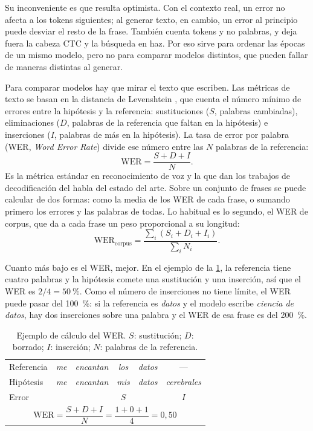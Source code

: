 Su inconveniente es que resulta optimista. Con el contexto real, un error no afecta a los tokens siguientes; al generar texto, en cambio, un error al principio puede desviar el resto de la frase. También cuenta tokens y no palabras, y deja fuera la cabeza CTC y la búsqueda en haz. Por eso sirve para ordenar las épocas de un mismo modelo, pero no para comparar modelos distintos, que pueden fallar de maneras distintas al generar.

Para comparar modelos hay que mirar el texto que escriben. Las métricas de texto se basan en la distancia de Levenshtein \cite{levenshtein1966}, que cuenta el número mínimo de errores entre la hipótesis y la referencia: sustituciones ($S$, palabras cambiadas), eliminaciones ($D$, palabras de la referencia que faltan en la hipótesis) e inserciones ($I$, palabras de más en la hipótesis). La tasa de error por palabra (WER, \textit{Word Error Rate}) divide ese número entre las $N$ palabras de la referencia:
\begin{equation}
  \mathrm{WER} = \frac{S + D + I}{N}.
  \label{eq:wer}
\end{equation}
Es la métrica estándar en reconocimiento de voz y la que dan los trabajos de decodificación del habla del estado del arte. Sobre un conjunto de frases se puede calcular de dos formas: como la media de los WER de cada frase, o sumando primero los errores y las palabras de todas. Lo habitual es lo segundo, el WER de corpus, que da a cada frase un peso proporcional a su longitud:
\begin{equation}
  \mathrm{WER}_{\mathrm{corpus}} = \frac{\sum_{i} (S_i + D_i + I_i)}{\sum_{i} N_i}.
  \label{eq:wer-corpus}
\end{equation}

Cuanto más bajo es el WER, mejor. En el ejemplo de la \cref{tab:ejemplo-wer}, la referencia tiene cuatro palabras y la hipótesis comete una sustitución y una inserción, así que el WER es $2/4 = \SI{50}{\percent}$. Como el número de inserciones no tiene límite, el WER puede pasar del \SI{100}{\percent}: si la referencia es \textit{datos} y el modelo escribe \textit{ciencia de datos}, hay dos inserciones sobre una palabra y el WER de esa frase es del \SI{200}{\percent}.

\begin{table}[htbp]
  \centering
  \caption[Ejemplo de cálculo del WER.]{Ejemplo de cálculo del WER. $S$: sustitución; $D$: borrado; $I$: inserción; $N$: palabras de la referencia.}
  \label{tab:ejemplo-wer}
  \begin{tabular}{lccccc}
    \hline
    Referencia & \textit{me} & \textit{encantan} & \textit{los} & \textit{datos} & --- \\
    Hipótesis  & \textit{me} & \textit{encantan} & \textit{mis} & \textit{datos} & \textit{cerebrales} \\
    Error      &             &                   & $S$          &                & $I$ \\
    \hline
    \multicolumn{6}{c}{\rule{0pt}{4.5ex}$\mathrm{WER} = \dfrac{S + D + I}{N} = \dfrac{1 + 0 + 1}{4} = 0{,}50$\rule[-2.5ex]{0pt}{0pt}} \\
    \hline
  \end{tabular}
\end{table}

